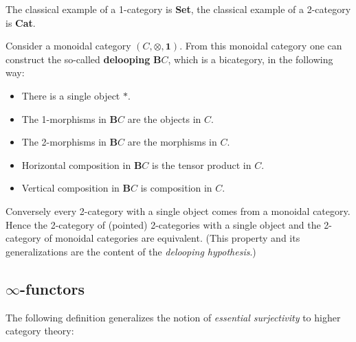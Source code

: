 	\begin{example}
		The classical example of a 1-category is \textbf{Set}, the classical example of a 2-category is \textbf{Cat}.
	\end{example}
	
	
	\begin{property}\label{cat:monoidal_or_2}
		Consider a monoidal category $(C, \otimes, \mathbf{1})$. From this monoidal category one can construct the so-called \textbf{delooping} $\mathbf{B}C$, which is a bicategory, in the following way:
		\begin{itemize}
			\item There is a single object $\ast$.
			\item The 1-morphisms in $\mathbf{B}C$ are the objects in $C$.
			\item The 2-morphisms in $\mathbf{B}C$ are the morphisms in $C$.
			\item Horizontal composition in $\mathbf{B}C$ is the tensor product in $C$.
			\item Vertical composition in $\mathbf{B}C$ is composition in $C$.
		\end{itemize}
		Conversely every 2-category with a single object comes from a monoidal category. Hence the 2-category of (pointed) 2-categories with a single object and the 2-category of monoidal categories are equivalent. (This property and its generalizations are the content of the \textit{delooping hypothesis}.)
	\end{property}

\subsection{\texorpdfstring{$\infty$-functors}{Infinity-functors}}

	The following definition generalizes the notion of \textit{essential surjectivity} to higher category theory:

